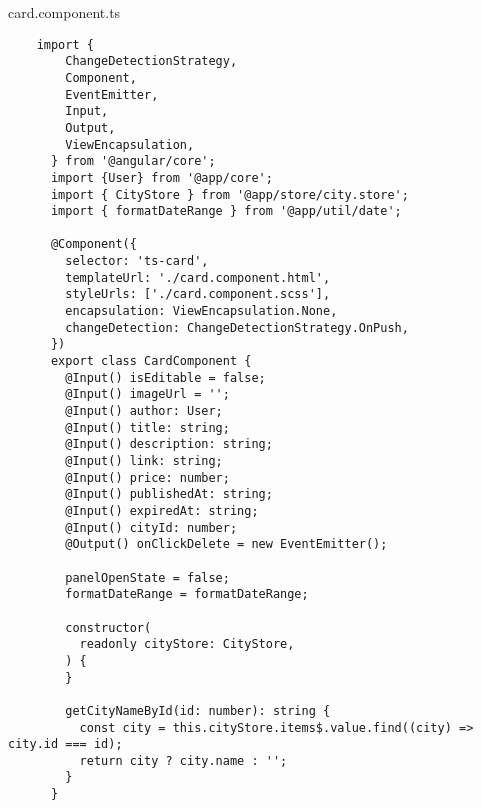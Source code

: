 card.component.ts
\lstset{style=ts}
\begin{lstlisting}
    import {
        ChangeDetectionStrategy,
        Component,
        EventEmitter,
        Input,
        Output,
        ViewEncapsulation,
      } from '@angular/core';
      import {User} from '@app/core';
      import { CityStore } from '@app/store/city.store';
      import { formatDateRange } from '@app/util/date';
      
      @Component({
        selector: 'ts-card',
        templateUrl: './card.component.html',
        styleUrls: ['./card.component.scss'],
        encapsulation: ViewEncapsulation.None,
        changeDetection: ChangeDetectionStrategy.OnPush,
      })
      export class CardComponent {
        @Input() isEditable = false;
        @Input() imageUrl = '';
        @Input() author: User;
        @Input() title: string;
        @Input() description: string;
        @Input() link: string;
        @Input() price: number;
        @Input() publishedAt: string;
        @Input() expiredAt: string;
        @Input() cityId: number;
        @Output() onClickDelete = new EventEmitter();
      
        panelOpenState = false;
        formatDateRange = formatDateRange;
      
        constructor(
          readonly cityStore: CityStore, 
        ) {
        }
      
        getCityNameById(id: number): string {
          const city = this.cityStore.items$.value.find((city) => city.id === id);
          return city ? city.name : '';
        }
      }      
\end{lstlisting}


\fi
